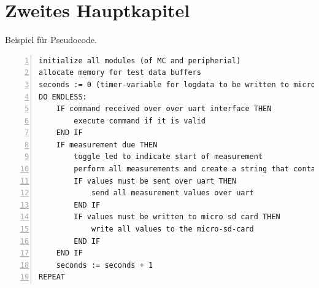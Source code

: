\section{Zweites Hauptkapitel}
Beispiel für Pseudocode.\\
\begin{Verbatim}[tabsize=2,frame=single,label=Pseudo code of the firmware main-method,baselinestretch=0.8,numbers=left]
initialize all modules (of MC and peripherial)
allocate memory for test data buffers
seconds := 0 (timer-variable for logdata to be written to micro-sd-card)
DO ENDLESS:
	IF command received over over uart interface THEN
		execute command if it is valid
	END IF
	IF measurement due THEN
		toggle led to indicate start of measurement
		perform all measurements and create a string that contains all data
		IF values must be sent over uart THEN
			send all measurement values over uart
		END IF
		IF values must be written to micro sd card THEN
			write all values to the micro-sd-card
		END IF
	END IF	
	seconds := seconds + 1
REPEAT
\end{Verbatim}